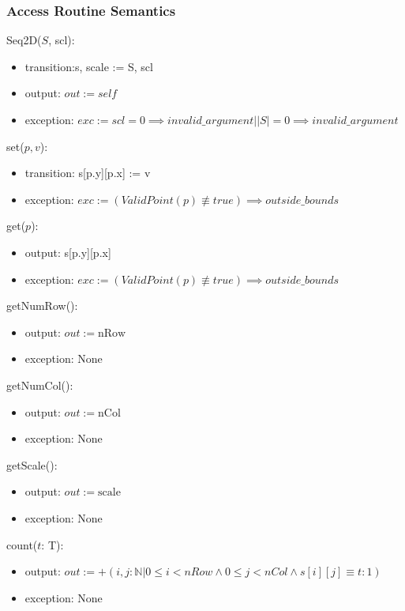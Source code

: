 \documentclass[12pt]{article}
\begin{document}
\subsubsection* {Access Routine Semantics}

Seq2D($S$, scl):
\begin{itemize}
\item transition:s, scale := S, scl
\item output: $\mathit{out} := \mathit{self}$
\item exception: $exc := scl = 0 \implies invalid\_argument | |S| = 0 \implies invalid\_argument$
\end{itemize}

\noindent set($p, v$):
\begin{itemize}
\item transition: s[p.y][p.x] := v
\item exception: $exc := (ValidPoint(p) \not\equiv true) \implies outside\_bounds$
\end{itemize}

\noindent get($p$):
\begin{itemize}
\item output: s[p.y][p.x]
\item exception: $exc := (ValidPoint(p) \not\equiv true) \implies outside\_bounds$
\end{itemize}

\noindent getNumRow():
\begin{itemize}
\item output: $out := \mbox{nRow}$
\item exception: None
\end{itemize}

\noindent getNumCol():
\begin{itemize}
\item output: $out := \mbox{nCol}$
\item exception: None
\end{itemize}

\noindent getScale():
\begin{itemize}
\item output: $out := \mbox{scale}$
\item exception: None
\end{itemize}

\noindent count($t$: T):
\begin{itemize}
\item output: $out := +(i, j :\mathbb{N} | 0 \leq i < nRow \land 0 \leq j < nCol \land s[i][j] \equiv t :1)$
\item exception: None
\end{itemize}
\end{document}
